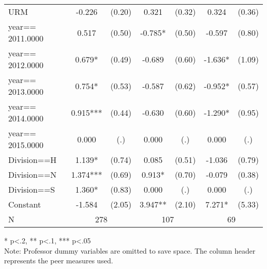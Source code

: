 \begin{sidewaystable}[htb]
\begin{threeparttable}
\begin{tabular}{l|c|c|c|c|c|c}
      URM                 &      -0.226                       &      (0.20)   &       0.321                       &      (0.32)   &       0.324                       &      (0.36)   \\
      year==  2011.0000   &       0.517                       &      (0.50)   &      -0.785*                      &      (0.50)   &      -0.597                       &      (0.80)   \\
      year==  2012.0000   &       0.679*                      &      (0.49)   &      -0.689                       &      (0.60)   &      -1.636*                      &      (1.09)   \\
      year==  2013.0000   &       0.754*                      &      (0.53)   &      -0.587                       &      (0.62)   &      -0.952*                      &      (0.57)   \\
      year==  2014.0000   &       0.915***                    &      (0.44)   &      -0.630                       &      (0.60)   &      -1.290*                      &      (0.95)   \\
      year==  2015.0000   &       0.000                       &         (.)   &       0.000                       &         (.)   &       0.000                       &         (.)   \\
      Division==H         &       1.139*                      &      (0.74)   &       0.085                       &      (0.51)   &      -1.036                       &      (0.79)   \\
      Division==N         &       1.374***                    &      (0.69)   &       0.913*                      &      (0.70)   &      -0.079                       &      (0.38)   \\
      Division==S         &       1.360*                      &      (0.83)   &       0.000                       &         (.)   &       0.000                       &         (.)   \\
      Constant            &      -1.584                       &      (2.05)   &       3.947**                     &      (2.10)   &       7.271*                      &      (5.33)   \\
      \hline
      N                 & \multicolumn{2}{|c}{278} & \multicolumn{2}{|c}{107} & \multicolumn{2}{|c}{69}               \\
      \hline
      \hline
    \end{tabular}
    \begin{tablenotes}
    \item{* p<.2, ** p<.1, *** p<.05 \\ Note: Professor dummy variables are omitted to save space. The column header represents the peer measures used.}
    \end{tablenotes}
  \end{threeparttable}
\end{sidewaystable}

